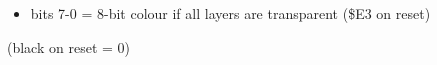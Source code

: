 \begin{itemize}
\item bits 7-0 = 8-bit colour if all layers are transparent (\$E3 on
  reset)
\end{itemize}
(black on reset = 0)

